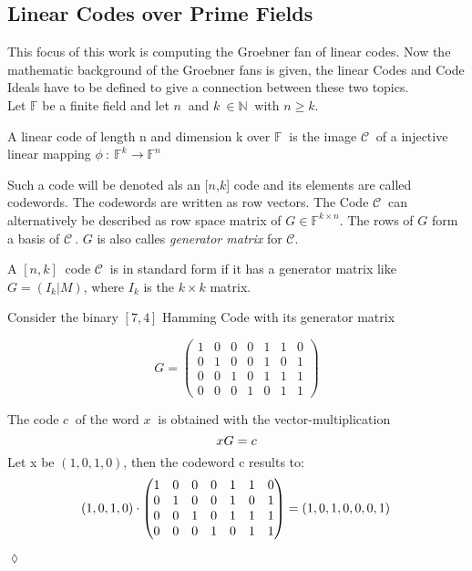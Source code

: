    

\newpage

\subsection{Linear Codes over Prime Fields}
\label{subsec:linearcodes}
This focus of this work is computing the Groebner fan of linear codes. Now the mathematic background of the Groebner fans is given, the linear Codes and Code Ideals have to be defined to give a connection between these two topics.\\ 
Let $\mathbb{F}$ be a finite field and let $n~$ and $k~\in \mathbb{N}~$ with $n\geq k$.
\begin{env_definition}
\cite{dueckjournal} A linear code of length n and dimension k over $\mathbb{F}~$ is the image $\mathcal{C}~$ of a injective linear mapping $\phi~:~\mathbb{F}^{k} \rightarrow \mathbb{F}^{n}  $
\end{env_definition} 
Such a code will be denoted als an [$n$,$k$] code and its elements are called codewords. The codewords are written 
as row vectors. The Code $\mathcal{C}~$ can alternatively be described as row space matrix of $G \in \mathbb{F}^{k \times n}$. The rows of $G$ form a basis of $\mathcal{C}~$.
$G$ is also calles \textit{generator matrix} for $\mathcal{C}$.

\begin{env_definition}
\cite{dueckjournal}
A $[n,k]~$ code $\mathcal{C}~$ is in standard form if it has a generator matrix like $G = (I_{k}| M)$, where $I_{k}$ is the $k \times k$ matrix.
\end{env_definition}


\begin{env_example}\normalfont
Consider the binary $[7,4]$ Hamming Code with its generator matrix

\[
G =
\begin{pmatrix}
1 & 0 & 0 & 0 & 1 & 1 & 0 \\ 
0 & 1 & 0 & 0 & 1 & 0 & 1 \\  
0 & 0 & 1 & 0 & 1 & 1 & 1 \\ 
0 & 0 & 0 & 1 & 0 & 1 & 1
\end{pmatrix} 
\]

The code $c~$ of the word $x~$ is obtained with the vector-multiplication
\[
     xG = c \\
 \]
 Let x be $\left(1,0,1,0\right)$, then the codeword c results to:
 \[
      \left(1,0,1,0\right) \cdot \begin{pmatrix}
      1 & 0 & 0 & 0 & 1 & 1 & 0 \\ 
      0 & 1 & 0 & 0 & 1 & 0 & 1 \\  
      0 & 0 & 1 & 0 & 1 & 1 & 1 \\ 
      0 & 0 & 0 & 1 & 0 & 1 & 1
      \end{pmatrix}   = \left(1,0,1,0,0,0,1\right) \\
  \]
\begin{flushright}
$\lozenge$
\end{flushright} 

\end{env_example}

